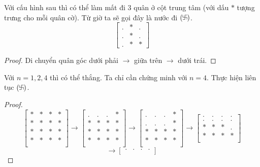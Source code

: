 \documentclass[11pt]{scrartcl}
\begin{document}
\begin{itemize}[label=, leftmargin=0em, itemsep=0.5em]
\begin{sol}
         Với cấu hình sau thì có thể làm mất đi 3 quân ở cột trung tâm (với dấu $*$ tượng trưng cho mỗi quân cờ). Từ giờ ta sẽ gọi đây là nước đi $(\fa)$.
        \[
        \begin{bmatrix}
        . & * & . \\
        .& * & . \\
        . & * & *
        \end{bmatrix}
        \]
        \begin{proof}
            Di chuyển quân góc dưới phải $\to$ giữa trên $\to$ dưới trái.
        \end{proof}
         Với $n = 1,2,4$ thì có thể thắng. Ta chỉ cần chứng minh với $n = 4$. Thực hiện liên tục $(\fa)$.
        \begin{proof}
        \[
        \begin{bmatrix}
        * & * & *&*\\
        * & * & *&*\\
        * & * & *&*\\
        * & * & *&*\\
        \end{bmatrix}
        \to 
        \begin{bmatrix}
            . & . & .&*\\
            * & * & *&*\\
            * & * & *&*\\
            * & * & *&*\\
        \end{bmatrix}
        \to 
        \begin{bmatrix}
            . & . & .&*\\
            . & . & .&*\\
            * & * & *&*\\
            * & * & *&*\\
        \end{bmatrix}
        \to 
        \begin{bmatrix}
            . & . & .&.\\
            . & . & .&.\\
            * & * & *&.\\
            * & * & *&*\\
        \end{bmatrix}
        \]
        \[
        \to 
        \begin{bmatrix}
            . & . & .&.\\

\end{bmatrix}\]
\end{proof}
\end{sol}
\end{itemize}
\end{document}

